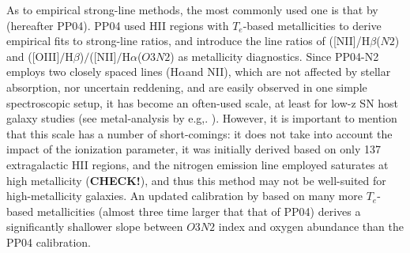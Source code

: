 \documentclass{emulateapj}
\newcommand{\ha}{H$\alpha$}
\newcommand{\hb}{H$\beta$}
\begin{document}
As to empirical strong-line methods, the most commonly used one is that by \citet{pettini04} (hereafter PP04). PP04 used HII regions with $T_e$-based metallicities to derive empirical fits to strong-line ratios, and introduce the line ratios of ([NII]/\hb ($N2$) and ([OIII]$/$\hb)$/$([NII]$/$\ha ($O3N2$) as metallicity diagnostics. Since PP04-N2 employs two closely spaced lines (\ha and NII), which are not affected by stellar absorption, nor uncertain reddening, and are easily observed in one simple spectroscopic setup, it has become an often-used scale, at least for low-z SN host galaxy studies (see metal-analysis by e.g,. \citealt{sanders12,modjaz12_proc,leloudas14}). However, it is important to mention that this scale has a number of short-comings: it does not take into account the impact of the ionization parameter, it was initially derived based on only 137 extragalactic HII regions, and the nitrogen emission line employed saturates at high metallicity (\textbf{CHECK!}), and thus this method may not be well-suited for high-metallicity galaxies. An updated calibration by \citet{marino13} based on many more $T_e$-based metallicities (almost three time larger that that of PP04) derives a significantly shallower slope between $O3N2$ index and oxygen abundance than the PP04 calibration.

\end{document}
